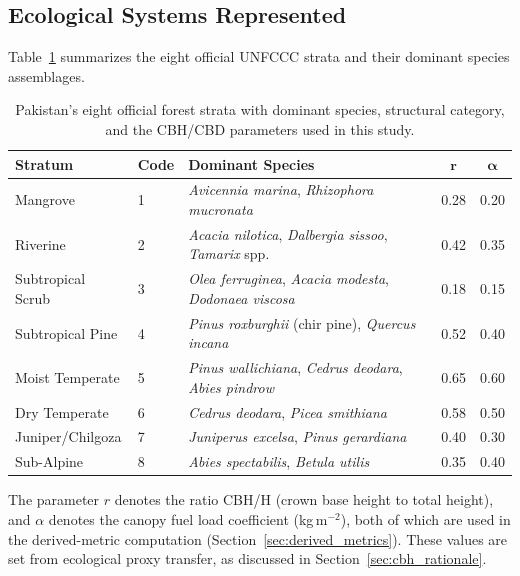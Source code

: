 \documentclass[12pt,a4paper,twoside]{article}
\begin{document}
\subsection{Ecological Systems Represented}

Table~\ref{tab:strata} summarizes the eight official UNFCCC strata and their
dominant species assemblages.

\begin{table}[H]
\centering
\caption{Pakistan's eight official forest strata with dominant species, structural
category, and the CBH/CBD parameters used in this study.}
\label{tab:strata}
\small
\begin{tabularx}{\textwidth}{@{}l l X c c@{}}
\toprule
\textbf{Stratum} & \textbf{Code} & \textbf{Dominant Species} & $\boldsymbol{r}$ & $\boldsymbol{\alpha}$ \\
\midrule
Mangrove & 1 & \textit{Avicennia marina}, \textit{Rhizophora mucronata} & 0.28 & 0.20 \\
Riverine & 2 & \textit{Acacia nilotica}, \textit{Dalbergia sissoo}, \textit{Tamarix} spp. & 0.42 & 0.35 \\
Subtropical Scrub & 3 & \textit{Olea ferruginea}, \textit{Acacia modesta}, \textit{Dodonaea viscosa} & 0.18 & 0.15 \\
Subtropical Pine & 4 & \textit{Pinus roxburghii} (chir pine), \textit{Quercus incana} & 0.52 & 0.40 \\
Moist Temperate & 5 & \textit{Pinus wallichiana}, \textit{Cedrus deodara}, \textit{Abies pindrow} & 0.65 & 0.60 \\
Dry Temperate & 6 & \textit{Cedrus deodara}, \textit{Picea smithiana} & 0.58 & 0.50 \\
Juniper/Chilgoza & 7 & \textit{Juniperus excelsa}, \textit{Pinus gerardiana} & 0.40 & 0.30 \\
Sub-Alpine & 8 & \textit{Abies spectabilis}, \textit{Betula utilis} & 0.35 & 0.40 \\
\bottomrule
\end{tabularx}
\end{table}

The parameter $r$ denotes the ratio CBH/H (crown base height to total height), and
$\alpha$ denotes the canopy fuel load coefficient (kg\,m$^{-2}$), both of which are
used in the derived-metric computation (Section~\ref{sec:derived_metrics}).  These
values are set from ecological proxy transfer, as discussed in
Section~\ref{sec:cbh_rationale}.

\end{document}
